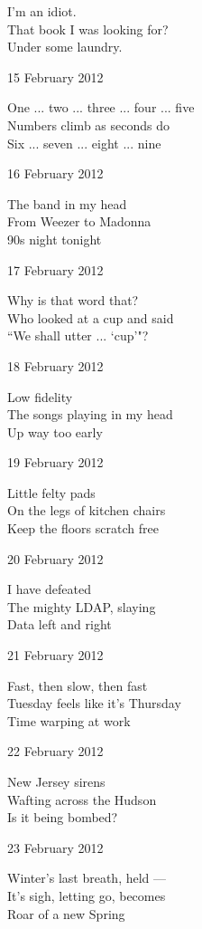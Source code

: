 \documentclass[12pt]{article}
\begin{document}
I'm an idiot. \\
That book I was looking for? \\
Under some laundry.

15 February 2012

One ... two ... three ... four ... five \\
Numbers climb as seconds do \\
Six ... seven ... eight ... nine

\newpage

16 February 2012

The band in my head \\
From Weezer to Madonna \\
90s night tonight

17 February 2012

Why is that word that? \\
Who looked at a cup and said \\
``We shall utter ... `cup'"?

18 February 2012

Low fidelity \\
The songs playing in my head \\
Up way too early

19 February 2012

Little felty pads \\
On the legs of kitchen chairs \\
Keep the floors scratch free

20 February 2012

I have defeated \\
The mighty LDAP, slaying \\
Data left and right

21 February 2012

Fast, then slow, then fast \\
Tuesday feels like it's Thursday \\
Time warping at work

22 February 2012

New Jersey sirens \\
Wafting across the Hudson \\
Is it being bombed?


\newpage

23 February 2012

Winter's last breath, held --- \\
It's sigh, letting go, becomes \\
Roar of a new Spring
\end{document}
